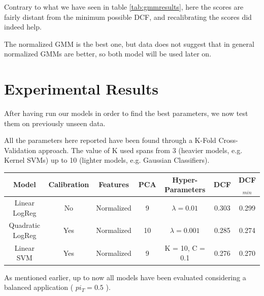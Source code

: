 \documentclass[12pt, twocolumn]{article}
\begin{document}
Contrary to what we have seen in table \ref{tab:gmmresults}, here the scores are fairly distant from the minimum possible DCF, and recalibrating the scores did indeed help.

The normalized GMM is the best one, but data does not suggest that in general normalized GMMs are better, so both model will be used later on.

\section{Experimental Results}

After having run our models in order to find the best parameters, we now test them on previously unseen data.

All the parameters here reported have been found through a K-Fold Cross-Validation approach.
The value of K used spans from 3 (heavier models, e.g. Kernel SVMs) up to 10 (lighter models, e.g. Gaussian Classifiers).

\begin{table}[t] 
    \centering
    \begin{tabular}{||c|c|c|c|c|c|c||}
        \hline 
        Model & Calibration & Features & PCA & Hyper-Parameters & DCF & DCF$_{min}$ \\
        \hline
        Linear LogReg & No & Normalized & 9 & $\lambda = 0.01$ & 0.303 & 0.299 \\
        Quadratic LogReg & Yes & Normalized & 10 & $\lambda = 0.001$ & 0.285 & 0.274 \\
        Linear SVM & Yes & Normalized & 9 & K = 10, C = 0.1 & 0.276 & 0.270 \\
        \hline
    \end{tabular}
\end{table}

\newpage

As mentioned earlier, up to now all models have been evaluated considering a balanced application ( $pi_T = 0.5$ ).
\end{document}
